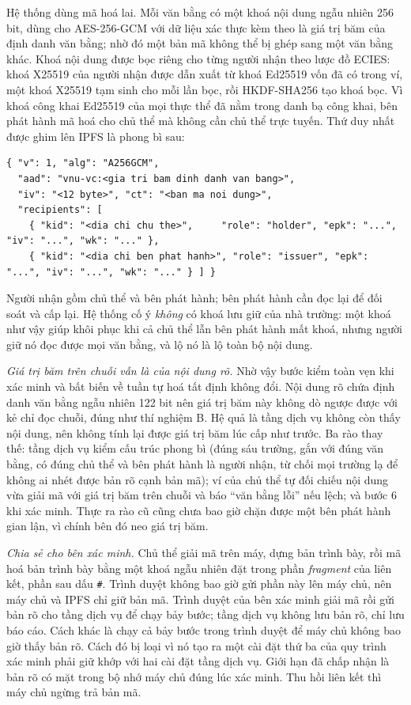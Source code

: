Hệ thống dùng mã hoá lai. Mỗi văn bằng có một khoá nội dung ngẫu nhiên 256 bit, dùng cho AES-256-GCM với dữ liệu xác thực kèm theo là giá trị băm của định danh văn bằng; nhờ đó một bản mã không thể bị ghép sang một văn bằng khác. Khoá nội dung được bọc riêng cho từng người nhận theo lược đồ ECIES: khoá X25519 của người nhận được dẫn xuất từ khoá Ed25519 vốn đã có trong ví, một khoá X25519 tạm sinh cho mỗi lần bọc, rồi HKDF-SHA256 tạo khoá bọc. Vì khoá công khai Ed25519 của mọi thực thể đã nằm trong danh bạ công khai, bên phát hành mã hoá cho chủ thể mà không cần chủ thể trực tuyến. Thứ duy nhất được ghim lên IPFS là phong bì sau:

\begin{lstlisting}
{ "v": 1, "alg": "A256GCM",
  "aad": "vnu-vc:<gia tri bam dinh danh van bang>",
  "iv": "<12 byte>", "ct": "<ban ma noi dung>",
  "recipients": [
    { "kid": "<dia chi chu the>",     "role": "holder", "epk": "...", "iv": "...", "wk": "..." },
    { "kid": "<dia chi ben phat hanh>", "role": "issuer", "epk": "...", "iv": "...", "wk": "..." } ] }
\end{lstlisting}

Người nhận gồm chủ thể và bên phát hành; bên phát hành cần đọc lại để đối soát và cấp lại. Hệ thống cố ý \emph{không} có khoá lưu giữ của nhà trường: một khoá như vậy giúp khôi phục khi cả chủ thể lẫn bên phát hành mất khoá, nhưng người giữ nó đọc được mọi văn bằng, và lộ nó là lộ toàn bộ nội dung.

\textit{Giá trị băm trên chuỗi vẫn là của nội dung rõ.} Nhờ vậy bước kiểm toàn vẹn khi xác minh và bất biến về tuần tự hoá tất định không đổi. Nội dung rõ chứa định danh văn bằng ngẫu nhiên 122 bit nên giá trị băm này không dò ngược được với kẻ chỉ đọc chuỗi, đúng như thí nghiệm B. Hệ quả là tầng dịch vụ không còn thấy nội dung, nên không tính lại được giá trị băm lúc cấp như trước. Ba rào thay thế: tầng dịch vụ kiểm cấu trúc phong bì (đúng sáu trường, gắn với đúng văn bằng, có đúng chủ thể và bên phát hành là người nhận, từ chối mọi trường lạ để không ai nhét được bản rõ cạnh bản mã); ví của chủ thể tự đối chiếu nội dung vừa giải mã với giá trị băm trên chuỗi và báo ``văn bằng lỗi'' nếu lệch; và bước 6 khi xác minh. Thực ra rào cũ cũng chưa bao giờ chặn được một bên phát hành gian lận, vì chính bên đó neo giá trị băm.

\textit{Chia sẻ cho bên xác minh.} Chủ thể giải mã trên máy, dựng bản trình bày, rồi mã hoá bản trình bày bằng một khoá ngẫu nhiên đặt trong phần \emph{fragment} của liên kết, phần sau dấu \texttt{\#}. Trình duyệt không bao giờ gửi phần này lên máy chủ, nên máy chủ và IPFS chỉ giữ bản mã. Trình duyệt của bên xác minh giải mã rồi gửi bản rõ cho tầng dịch vụ để chạy bảy bước; tầng dịch vụ không lưu bản rõ, chỉ lưu báo cáo. Cách khác là chạy cả bảy bước trong trình duyệt để máy chủ không bao giờ thấy bản rõ. Cách đó bị loại vì nó tạo ra một cài đặt thứ ba của quy trình xác minh phải giữ khớp với hai cài đặt tầng dịch vụ. Giới hạn đã chấp nhận là bản rõ có mặt trong bộ nhớ máy chủ đúng lúc xác minh. Thu hồi liên kết thì máy chủ ngừng trả bản mã.

